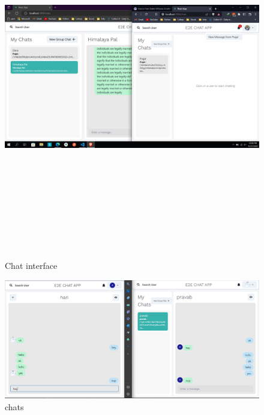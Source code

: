 \begin{figure}[H]
	\centering
	\includegraphics[width=160mm, height=160mm]{images/chat1.png}
	\caption{Chat interface} %
	\label{figusecase} %
\end{figure}

\begin{figure}[H]
	\centering
	\includegraphics[width=160mm]{images/chat3.png}
	\caption{chats}
	\label{figchat} %
\end{figure}

